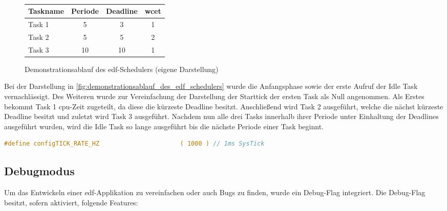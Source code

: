 \documentclass[../EDF Master Thesis.tex]{subfiles}
\begin{document}
\begin{figure}[ht!]
\begin{tikzpicture}
        \end{tikzpicture}\\
        \vspace {1cm}
        \begin{tabular}{l|c|c|c}
            Taskname & Periode & Deadline & \ac{wcet} \\
            \hline
            Task 1 & 5 & 3 & 1 \\
            Task 2 & 5 & 5 & 2 \\
            Task 3 & 10 & 10 & 1 
        \end{tabular}
        \caption[Demonstrationsablauf des \ac{edf}-Schedulers]{Demonstrationsablauf des \ac{edf}-Schedulers (eigene Darstellung)}
        \label{fig:demonstrationsablauf_des_edf_schedulers}
    \end{figure}

    Bei der Darstellung in \autoref{fig:demonstrationsablauf_des_edf_schedulers} wurde die Anfangsphase sowie der erste Aufruf der Idle Task vernachlässigt.
    Des Weiteren wurde zur Vereinfachung der Darstellung der Starttick der ersten Task als Null angenommen.
    Als Erstes bekommt Task 1 \ac{cpu}-Zeit zugeteilt, da diese die kürzeste Deadline besitzt.
    Anschließend wird Task 2 ausgeführt, welche die nächst kürzeste Deadline besitzt und zuletzt wird Task 3 ausgeführt.
    Nachdem nun alle drei Tasks innerhalb ihrer Periode unter Einhaltung der Deadlines ausgeführt wurden, wird die Idle Task so lange ausgeführt bis die nächste Periode einer Task beginnt.

\begin{lstlisting}[language=C, caption=FreeRTOS SysTick Deklaration, label=code:freertos_sys_tick_deklaration]
    #define configTICK_RATE_HZ						( 1000 ) // 1ms SysTick
\end{lstlisting}

\clearpage

\subsection{Debugmodus} \label{section:debug_mode}

    Um das Entwickeln einer \ac{edf}-Applikation zu vereinfachen oder auch Bugs zu finden, wurde ein Debug-Flag integriert.
    Die Debug-Flag besitzt, sofern aktiviert, folgende Features:
\end{document}
